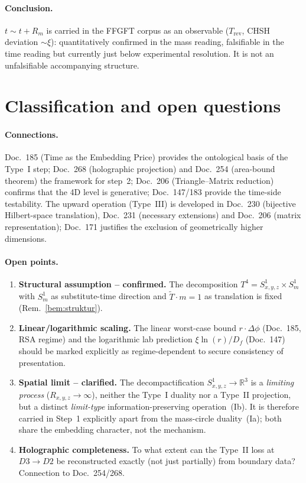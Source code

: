 \paragraph{Conclusion.}
$t\sim t+R_m$ is carried in the FFGFT corpus as an observable ($T_\text{rev}$,
CHSH deviation $\sim\xi$): quantitatively confirmed in the mass reading,
falsifiable in the time reading but currently just below experimental
resolution. It is not an unfalsifiable accompanying structure.

\section{Classification and open questions}\label{sec:offen}

\paragraph{Connections.}
Doc.~185 (Time as the Embedding Price) provides the ontological basis of the
Type~I step; Doc.~268 (holographic projection) and Doc.~254 (area-bound theorem)
the framework for step~2; Doc.~206 (Triangle--Matrix reduction) confirms that
the 4D level is generative; Doc.~147/183 provide the time-side testability. The upward operation (Type~III)
is developed in Doc.~230 (bijective Hilbert-space translation), Doc.~231
(necessary extensions) and Doc.~206 (matrix representation); Doc.~171 justifies
the exclusion of geometrically higher dimensions.

\paragraph{Open points.}
\begin{enumerate}
  \item \textbf{Structural assumption -- confirmed.} The decomposition
  $T^4 = S^1_{x,y,z}\times S^1_m$ with $S^1_m$ as substitute-time direction and
  $\tilde{T}\cdot m = 1$ as translation is fixed (Rem.~\ref{bem:struktur}).
  \item \textbf{Linear/logarithmic scaling.} The linear worst-case bound
  $r\cdot\Delta\phi$ (Doc.~185, RSA regime) and the logarithmic lab prediction
  $\xi\ln(r)/D_f$ (Doc.~147) should be marked explicitly as regime-dependent to
  secure consistency of presentation.
  \item \textbf{Spatial limit -- clarified.} The decompactification
  $S^1_{x,y,z}\to\mathbb{R}^3$ is a \emph{limiting process}
  ($R_{x,y,z}\to\infty$), neither the Type~I duality nor a Type~II projection,
  but a distinct \emph{limit-type} information-preserving operation~(Ib). It is
  therefore carried in Step~1 explicitly apart from the mass-circle duality~(Ia);
  both share the embedding character, not the mechanism.
  \item \textbf{Holographic completeness.} To what extent can the Type~II loss
  at $D3\to D2$ be reconstructed exactly (not just partially) from boundary
  data? Connection to Doc.~254/268.
\end{enumerate}
